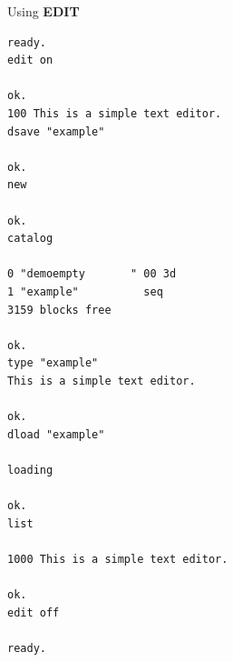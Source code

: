 \begin{description}[leftmargin=2cm,style=nextline]
\item [Examples:] Using {\bf EDIT}

\begin{tcolorbox}[colback=black,coltext=white]
\verbatimfont{\codefont}
\begin{verbatim}
ready.
edit on

ok.
100 This is a simple text editor.
dsave "example"

ok.
new

ok.
catalog

0 "demoempty       " 00 3d
1 "example"          seq
3159 blocks free

ok.
type "example"
This is a simple text editor.

ok.
dload "example"

loading

ok.
list

1000 This is a simple text editor.

ok.
edit off

ready.
\end{verbatim}
\end{tcolorbox}
\end{description}


\newpage
